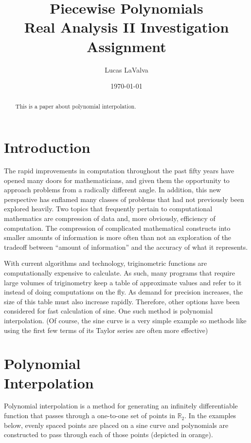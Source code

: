\documentclass[12pt]{article}
\title{Piecewise Polynomials \\
    {\large Real Analysis II Investigation Assignment}}
\author{Lucas LaValva}
\date{\today}
\begin{document}
\maketitle

\begin{abstract}
    This is a paper about polynomial interpolation.
\end{abstract}

\begin{multicols*}{2}
    \section{Introduction}

    The rapid improvements in computation throughout the past fifty years have opened many doors for mathematicians, and given them the opportunity to approach problems from a radically different angle. In addition, this new perspective has enflamed many classes of problems that had not previously been explored heavily. Two topics that frequently pertain to computational mathematics are compression of data and, more obviously, efficiency of computation. The compression of complicated mathematical constructs into smaller amounts of information is more often than not an exploration of the tradeoff between ``amount of information'' and the accuracy of what it represents.

    With current algorithms and technology, triginometric functions are computationally expensive to calculate. As such, many programs that require large volumes of triginometry keep a table of approximate values and refer to it instead of doing computations on the fly. As demand for precision increases, the size of this table must also increase rapidly. Therefore, other options have been considered for fast calculation of sine. One such method is polynomial interpolation. (Of course, the sine curve is a very simple example so methods like using the first few terms of its Taylor series are often more effective)


    \section{Polynomial \\
      Interpolation}

    Polynomial interpolation \cite{enwiki:polynomial_interpolation} is a method for generating an infinitely differentiable function that passes through a one-to-one set of points in $\mathbb{R}_2$. In the examples below, evenly spaced points are placed on a sine curve and polynomials are constructed to pass through each of those points (depicted in orange).


\end{multicols*}
\end{document}
